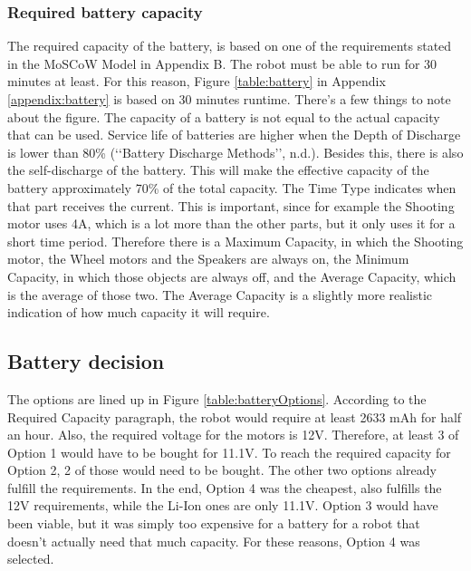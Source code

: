 \documentclass[11pt,twoside,a4paper]{report}
\begin{document}
\subsubsection{Required battery capacity}
The required capacity of the battery, is based on one of the requirements stated in the MoSCoW Model in Appendix B. The robot must be able to run for 30 minutes at least. For this reason, Figure \ref{table:battery} in Appendix \ref{appendix:battery} is based on 30 minutes runtime. 
There\rq{}s a few things to note about the figure. The capacity of a battery is not equal to the actual capacity that can be used. Service life of batteries are higher when the Depth of Discharge is lower than 80\% (\lq\lq{}Battery Discharge Methods\rq\rq{}, n.d.). Besides this, there is also the self-discharge of the battery. This will make the effective capacity of the battery approximately 70\% of the total capacity. 
The Time Type indicates when that part receives the current. This is important, since for example the Shooting motor uses 4A, which is a lot more than the other parts, but it only uses it for a short time period. Therefore there is a Maximum Capacity, in which the Shooting motor, the Wheel motors and the Speakers are always on, the Minimum Capacity, in which those objects are always off, and the Average Capacity, which is the average of those two. The Average Capacity is a slightly more realistic indication of how much capacity it will require. 

\subsection{Battery decision}
The options are lined up in Figure \ref{table:batteryOptions}. According to the Required Capacity paragraph, the robot would require at least 2633 mAh for half an hour. Also, the required voltage for the motors is 12V. Therefore, at least 3 of Option 1 would have to be bought for 11.1V. To reach the required capacity for Option 2, 2 of those would need to be bought. The other two options already fulfill the requirements. 
In the end, Option 4 was the cheapest, also fulfills the 12V requirements, while the Li-Ion ones are only 11.1V. Option 3 would have been viable, but it was simply too expensive for a battery for a robot that doesn\rq{}t actually need that much capacity. 
For these reasons, Option 4 was selected. 
 \newpage
\end{document}
